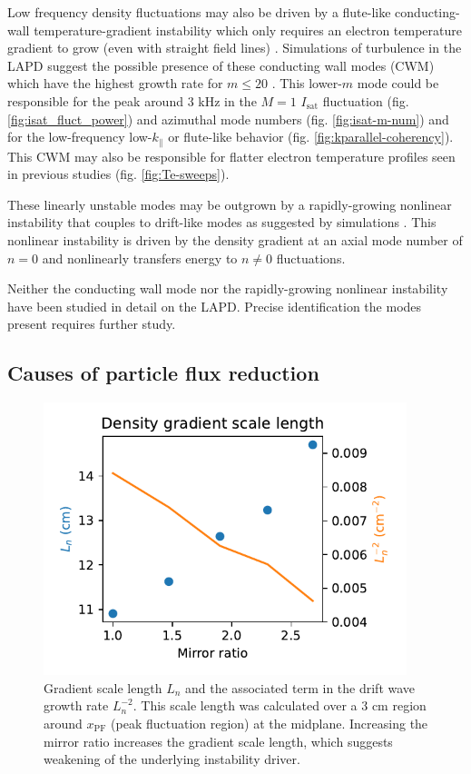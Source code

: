 Low frequency density fluctuations may also be driven by a flute-like conducting-wall temperature-gradient instability which only requires an electron temperature gradient to grow (even with straight field lines) \cite{Berk_1991}. Simulations of turbulence in the LAPD suggest the possible presence of these conducting wall modes (CWM) which have the highest growth rate for $m \leq 20$ \cite{Friedman_2013}. This lower-$m$ mode could be responsible for the peak around $3$ kHz in the $M=1$ $I_\text{sat}$ fluctuation (fig. \ref{fig:isat_fluct_power}) and azimuthal mode numbers (fig. \ref{fig:isat-m-num}) and for the low-frequency low-$k_\parallel$ or flute-like behavior (fig. \ref{fig:kparallel-coherency}). This CWM may also be responsible for flatter electron temperature profiles seen in previous studies \cite{Perks_impact_2022, Schaffner_2013} (fig. \ref{fig:Te-sweeps}).

These linearly unstable modes may be outgrown by a rapidly-growing nonlinear instability that couples to drift-like modes as suggested by simulations \cite{Friedman_2013}. This nonlinear instability is driven by the density gradient at an axial mode number of $n=0$ and nonlinearly transfers energy to $n \neq 0$ fluctuations. 

Neither the conducting wall mode nor the rapidly-growing nonlinear instability have been studied in detail on the LAPD. Precise identification the modes present requires further study.

\subsection{Causes of particle flux reduction}

\begin{figure}
    \centering
    \includegraphics[width=300pt]{figures/fig19.pdf}
    \caption[Gradient scale length $L_n$]{Gradient scale length $L_n$ and the associated term in the drift wave growth rate $L_n^{-2}$. This scale length was calculated over a 3 cm region around $x_\text{PF}$ (peak fluctuation region) at the midplane. Increasing the mirror ratio increases the gradient scale length, which suggests weakening of the underlying instability driver.}
    \label{fig:L_n}
\end{figure}

